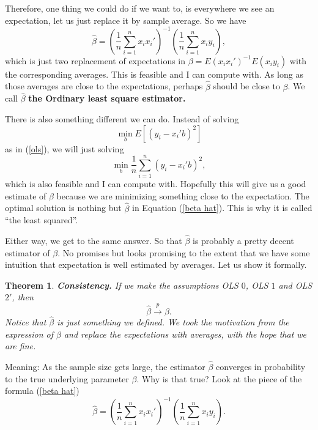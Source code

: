 \documentclass[11pt,a4paper]{amsart}
\theoremstyle{plain}
\newtheorem{theorem}{Theorem}
\theoremstyle{definition}
\begin{document}
	 Therefore, one thing we could do if we want to, is everywhere we see an expectation, let us just replace it by sample average. So we have
	 \begin{equation}\label{beta hat}
	 \hat{\beta} =  (\frac{1}{n}\sum_{i=1}^{n} x_{i}x_{i}')^{-1}(\frac{1}{n}\sum_{i=1}^{n}x_{i}y_{i}),
	 \end{equation}
	 which is just two replacement of expectations in $\beta = E(x_{i}x_{i}')^{-1}E(x_{i}y_{i})$ with the corresponding averages. This is feasible and I can compute with. As long as those averages are close to the expectations, perhaps $\hat{\beta}$ should be close to $\beta$. We call $\hat{\beta}$ \textbf{the Ordinary least square estimator.}\par 
	 There is also something different we can do. Instead of solving 
	 \[	\min_{b} E[(y_{i}-x_{i}'b)^{2}]	\]
	 as in (\ref{ols}), we will just solving
	 \[	\min_{b} \frac{1}{n}\sum_{i=1}^{n} (y_{i}-x_{i}'b)^{2},	\]
	 which is also feasible and I can compute with. Hopefully this will give us a good estimate of $\beta$ because we are minimizing something close to the expectation. The optimal solution is nothing but $\hat{\beta}$ in Equation (\ref{beta hat}). This is why it is called ``the least squared''.\par 
	 Either way, we get to the same answer. So that $\hat{\beta}$ is probably a pretty decent estimator of $\beta$. No promises but looks promising to the extent that we have some intuition that expectation is well estimated by averages. Let us show it formally.
	 \begin{theorem}
	 	\textbf{Consistency.} If we make the assumptions OLS $0$, OLS $1$ and OLS $2'$, then 
	 	\[	\hat{\beta} \stackrel{p}{\longrightarrow} \beta.	\]
	 	Notice that $\hat{\beta}$ is just something we defined. We took the motivation from the expression of $\beta$ and replace the expectations with averages, with the hope that we are fine. 
	 \end{theorem}
 	Meaning: As the sample size gets large, the estimator $\hat{\beta}$ converges in probability to the true underlying parameter  $\beta$. Why is that true? Look at the piece of the formula (\ref{beta hat})
 	\[	\hat{\beta} =  (\frac{1}{n}\sum_{i=1}^{n} x_{i}x_{i}')^{-1}(\frac{1}{n}\sum_{i=1}^{n}x_{i}y_{i}).	\]
\end{document}
